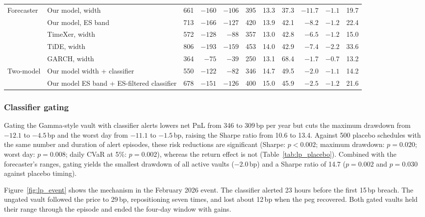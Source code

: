 \begin{table}[pos=!htbp,align=\centering]
{\begin{tabular}{llrrrrrrrrr}
\midrule
\multirow{5}{*}{Forecaster} & Our model, width & 661 & $-160$ & $-106$ & 395 & 13.3 & 37.3 & $-11.7$ & $-1.1$ & 19.7 \\
 & Our model, ES band & 713 & $-166$ & $-127$ & 420 & 13.9 & 42.1 & $-8.2$ & $-1.2$ & 22.4 \\
 & TimeXer, width & 572 & $-128$ & $-88$ & 357 & 13.0 & 42.8 & $-6.5$ & $-1.2$ & 15.0 \\
 & TiDE, width & 806 & $-193$ & $-159$ & 453 & 14.0 & 42.9 & $-7.4$ & $-2.2$ & 33.6 \\
 & GARCH, width & 364 & $-75$ & $-39$ & 250 & 13.1 & 68.4 & $-1.7$ & $-0.7$ & 13.2 \\
\midrule
\multirow{2}{*}{Two-model} & Our model width + classifier & 550 & $-122$ & $-82$ & 346 & 14.7 & 49.5 & $-2.0$ & $-1.1$ & 14.2 \\
 & Our model ES band + ES-filtered classifier & 678 & $-151$ & $-126$ & 400 & 15.0 & 45.9 & $-2.5$ & $-1.2$ & 21.6 \\
\bottomrule
\end{tabular}
}
\end{table}

\subsubsection{Classifier gating}

Gating the Gamma-style vault with classifier alerts lowers net PnL from 346 to 309\,bp per year
but cuts the maximum drawdown from $-12.1$ to $-4.5$\,bp and the worst day from $-11.1$ to
$-1.5$\,bp, raising the Sharpe ratio from 10.6 to 13.4. Against 500 placebo schedules with the
same number and duration of alert episodes, these risk reductions are significant (Sharpe:
$p<0.002$; maximum drawdown: $p=0.020$; worst day: $p=0.008$; daily CVaR at 5\%: $p=0.002$),
whereas the return effect is not (Table~\ref{tab:lp_placebo}). Combined with the forecaster's
ranges, gating yields the smallest drawdown of all active vaults ($-2.0$\,bp) and a Sharpe
ratio of 14.7 ($p=0.002$ and $p=0.030$ against placebo timing).

Figure~\ref{fig:lp_event} shows the mechanism in the February 2026 event. The classifier
alerted 23 hours before the first 15\,bp breach. The ungated vault followed the price to
29\,bp, repositioning seven times, and lost about 12\,bp when the peg recovered. Both gated
vaults held their range through the episode and ended the four-day window with gains.

